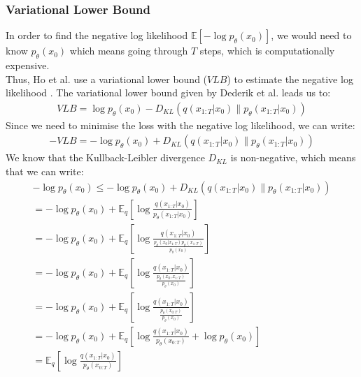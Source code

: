 \documentclass{article}
\begin{document}
\subsubsection{Variational Lower Bound}
In order to find the negative log likelihood $\mathbb{E}\left[- \log p_{\theta} \left(x_0\right)\right]$, we would need to know $p_{\theta} (x_0)$ which means going through $T$ steps, which is computationally expensive. \\
Thus, Ho et al. \cite{ho2020denoising} use a variational lower bound ($VLB$) to estimate the negative log likelihood \cite{ho2020denoising,sohldickstein2015deep}.
The variational lower bound given by Dederik et al. \cite{kingma2022autoencoding} leads us to:
\begin{gather}
  VLB = \log p_{\theta}\left(x_0\right) - D_{KL}\left(q\left(x_{1:T}|x_0\right) \| p_{\theta}\left(x_{1:T}|x_0\right)\right) \label{eq:7}
\end{gather}
Since we need to minimise the loss with the negative log likelihood, we can write:
\begin{gather}
  - VLB = - \log p_{\theta}\left(x_0\right) + D_{KL}\left(q\left(x_{1:T}|x_0\right) \| p_{\theta}\left(x_{1:T}|x_0\right)\right) \label{eq:8}
\end{gather}
We know that the Kullback-Leibler divergence $D_{KL}$ is non-negative, which means that we can write:
\begin{gather}
  - \log p_{\theta}\left(x_0\right) \leq - \log p_{\theta}\left(x_0\right) + D_{KL}\left(q\left(x_{1:T}|x_0\right) \| p_{\theta}\left(x_{1:T}|x_0\right)\right) \label{eq:9} \\
  = - \log p_{\theta}\left(x_0\right) + \mathbb{E}_q \left[\log \frac{q\left(x_{1:T}|x_0\right)}{p_{\theta}\left(x_{1:T}|x_0\right)}\right] \label{eq:10} \\
  = - \log p_{\theta}\left(x_0\right) + \mathbb{E}_q \left[\log \frac{q\left(x_{1:T}|x_0\right)}{\frac{p_{\theta}\left(x_0 | x_{1:T}\right) p_{\theta}\left(x_{1:T}\right)}{p_{\theta}\left(x_0\right)}}\right] \label{eq:11} \\
  = - \log p_{\theta}\left(x_0\right) + \mathbb{E}_q \left[\log \frac{q\left(x_{1:T}|x_0\right)}{\frac{p_{\theta}\left(x_0, x_{1:T}\right)}{p_{\theta}\left(x_0\right)}}\right] \label{eq:12} \\
  = - \log p_{\theta}\left(x_0\right) + \mathbb{E}_q \left[\log \frac{q\left(x_{1:T}|x_0\right)}{\frac{p_{\theta}\left(x_{0:T}\right)}{p_{\theta}\left(x_0\right)}}\right] \label{eq:13} \\
  = - \log p_{\theta}\left(x_0\right) + \mathbb{E}_q \left[\log \frac{q\left(x_{1:T}|x_0\right)}{p_{\theta}\left(x_{0:T}\right)} + \log {p_{\theta}\left(x_0\right)}\right] \label{eq:14} \\
  = \mathbb{E}_q \left[\log \frac{q\left(x_{1:T}|x_0\right)}{p_{\theta}\left(x_{0:T}\right)}\right] \label{eq:15}
\end{gather}
\end{document}
